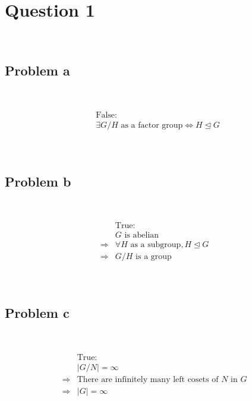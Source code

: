 \documentclass{article}
\begin{document}
\section*{Question 1}

~

\subsection*{Problem a}

~

\begin{equation*}
    \begin{split}
        &\text{False}:\\
        &\exists G/H \text{ as a factor group} \Leftrightarrow H\unlhd G\\
    \end{split}
\end{equation*}

~

\subsection*{Problem b}

~

\begin{equation*}
    \begin{split}
        &\text{True}:\\
        &G\text{ is abelian}\\
        \Rightarrow&\forall H\text{ as a subgroup},H\unlhd G\\
        \Rightarrow&G/H\text{ is a group}\\
    \end{split}
\end{equation*}

~

\subsection*{Problem c}

~

\begin{equation*}
    \begin{split}
        &\text{True}:\\
        &|G/N|=\infty\\
        \Rightarrow&\text{There are infinitely many left cosets of }N\text{ in }G\\
        \Rightarrow&|G|=\infty\\
    \end{split}
\end{equation*}
\end{document}
